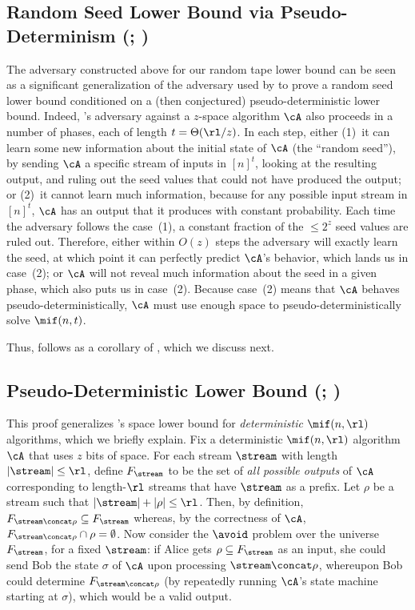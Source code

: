 \begin{itemize}
\begin{itemize}
\subsection{Random Seed Lower Bound via Pseudo-Determinism\texorpdfstring{ (;
)}{}} \label{subsec:rs-lb-overview}

The adversary constructed above for our random tape lower bound can be seen as
a significant generalization of the adversary used by \cite{Stoeckl23} to
prove a random seed lower bound conditioned on a (then conjectured)
pseudo-deterministic lower bound. Indeed, \cite{Stoeckl23}'s adversary against
a $z$-space algorithm $\cA$ also proceeds in a number of phases, each of
length $t = \Theta(\rl / z)$. In each step, either (1)~it can learn some new
information about the initial state of $\cA$ (the ``random seed''), by sending
$\cA$ a specific stream of inputs in $[n]^t$, looking at the resulting output,
and ruling out the seed values that could not have produced the output; or
(2)~it cannot learn much information, because for any possible input stream in
$[n]^t$, $\cA$ has an output that it produces with constant probability.  Each
time the adversary follows the case~(1), a constant fraction of the $\le 2^z$
seed values are ruled out. Therefore, either within $O(z)$ steps the adversary
will exactly learn the seed, at which point it can perfectly predict $\cA$'s
behavior, which lands us in case~(2); or $\cA$ will not reveal much
information about the seed in a given phase, which also puts us in case~(2).
Because case~(2) means that $\cA$ behaves pseudo-deterministically, $\cA$ must
use enough space to pseudo-deterministically solve $\mif(n, t)$.

Thus,  follows as a corollary of , which we
discuss next.

\subsection{Pseudo-Deterministic Lower Bound\texorpdfstring{ (; )}{}} \label{subsec:pd-lb-overview}

This proof generalizes \cite{Stoeckl23}'s space lower bound for {\em
deterministic} $\mif(n,\rl)$ algorithms, which we briefly explain. Fix a
deterministic $\mif(n,\rl)$ algorithm $\cA$ that uses $z$ bits of space. For
each stream $\stream$ with length $|\stream| \le \rl$, define $F_\stream$ to
be the set of {\em all possible outputs} of $\cA$ corresponding to
length-$\rl$ streams that have $\stream$ as a prefix. Let $\rho$ be a stream
such that $|\stream| + |\rho| \le \rl$. Then, by definition, $F_{\stream
\concat \rho} \subseteq F_\stream$ whereas, by the correctness of $\cA$,
$F_{\stream \concat \rho} \cap \rho = \emptyset$. Now consider the $\avoid$
problem over the universe $F_\stream$, for a fixed $\stream$: if Alice gets
$\rho \subseteq F_\stream$ as an input, she could send Bob the state $\sigma$
of $\cA$ upon processing $\stream \concat \rho$, whereupon Bob could determine
$F_{\stream \concat \rho}$ (by repeatedly running $\cA$'s state machine
starting at $\sigma$), which would be a valid output. 


\end{itemize}
\end{itemize}
